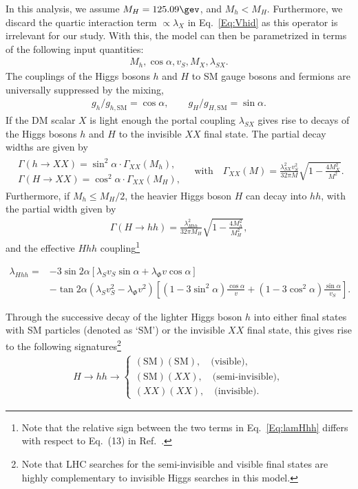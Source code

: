 \documentclass[../report.tex]{subfiles}
\begin{document}
In this analysis, we assume $M_H = 125.09\gev$, and $M_h < M_H$. Furthermore, we discard the quartic interaction term $\propto \lambda_X$ in Eq.~\eqref{Eq:Vhid} as this operator is irrelevant for our study. With this, the model can then be parametrized in terms of the following input quantities:
\begin{align}
M_h, \cos\alpha, v_S, M_X, \lambda_{SX}.
\end{align}
The couplings of the Higgs bosons $h$ and $H$ to SM gauge bosons and fermions are universally suppressed by the mixing,
\begin{align}
g_h/g_{h,\mathrm{SM}} = \cos \alpha , \qquad g_H/g_{H,\mathrm{SM}} = \sin\alpha.
\end{align}
If the DM scalar $X$ is light enough the portal coupling $\lambda_{SX}$ gives rise to decays of the Higgs bosons $h$ and $H$ to the invisible $XX$ final state. The partial decay widths are given by
\begin{align}
\label{eq:invdecaywidth}
\begin{array}{l} \Gamma(h\to XX) = \sin^2\alpha \cdot \Gamma_{XX} (M_h), \\ \Gamma(H\to XX) = \cos^2\alpha \cdot \Gamma_{XX} (M_H), \end{array} \quad \mbox{with} \quad \Gamma_{XX}(M) = \frac{\lambda_{SX}^2 v_S^2 }{32\pi M} \sqrt{1 - \frac{4M_X^2}{M^2}}.
\end{align}
Furthermore, if $M_h \le M_H/2$, the heavier Higgs boson $H$ can decay into $hh$, with the partial width given by
\begin{align}
\Gamma(H\to hh) = \frac{\lambda_{Hhh}^2}{32\pi M_H} \sqrt{1 - \frac{4M_h^2}{M_H^2}},
\end{align}
and the effective $Hhh$ coupling\footnote{Note that the relative sign between the two terms in Eq.~\eqref{Eq:lamHhh} differs with respect to Eq.~(13) in Ref.~\cite{Englert:2011yb}.}

\begin{align}
\label{Eq:lamHhh}
\lambda_{Hhh} = & - 3\sin2\alpha \left[ \lambda_S v_S \sin\alpha  + \lambda_{\Phi} v \cos\alpha \right] \nonumber\\
& - \tan2\alpha \left( \lambda_S v_S^2 - \lambda_{\Phi} v^2 \right) \left[ (1-3\sin^2\alpha) \frac{\cos\alpha}{v} + (1-3 \cos^2\alpha) \frac{\sin\alpha}{v_S} \right].
\end{align}


Through the successive decay of the lighter Higgs boson $h$ into either final states with SM particles (denoted as `SM') or the invisible $XX$ final state, this gives rise to the following signatures\footnote{{Note that LHC searches for the semi-invisible and visible final states are highly complementary to invisible Higgs searches in this model.}}
\begin{align}
H \to hh \to \left\{ \begin{array}{l} (\mathrm{SM}) (\mathrm{SM}) ,\quad \mbox{(visible)}, \\ (\mathrm{SM}) (XX) ,\quad \mbox{(semi-invisible)}, \\
(XX) (XX) ,\quad \mbox{(invisible)}.
\end{array} \right.
\end{align}
\end{document}
